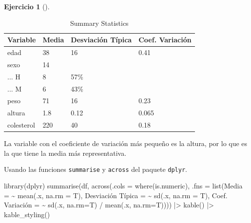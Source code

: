 \documentclass[
  a4paper,
]{scrreport}
\newenvironment{Shaded}{\begin{snugshade}}{\end{snugshade}}
\newcommand{\AttributeTok}[1]{\textcolor[rgb]{0.40,0.45,0.13}{#1}}
\newcommand{\ErrorTok}[1]{\textcolor[rgb]{0.68,0.00,0.00}{#1}}
\newcommand{\FunctionTok}[1]{\textcolor[rgb]{0.28,0.35,0.67}{#1}}
\newcommand{\NormalTok}[1]{\textcolor[rgb]{0.00,0.23,0.31}{#1}}
\newcommand{\OtherTok}[1]{\textcolor[rgb]{0.00,0.23,0.31}{#1}}
\newcommand{\SpecialCharTok}[1]{\textcolor[rgb]{0.37,0.37,0.37}{#1}}
\newcommand{\StringTok}[1]{\textcolor[rgb]{0.13,0.47,0.30}{#1}}
\theoremstyle{definition}
\newtheorem{exercise}{Ejercicio}[chapter]
\theoremstyle{remark}
\begin{document}
\begin{exercise}[]
\begin{enumerate}
\begin{tcolorbox}
\begin{table}
  \caption{\label{tab:unnamed-chunk-25}Summary Statistics}
  \centering
  \begin{tabular}[t]{llll}
  \toprule
  Variable & Media & Desviación Típica & Coef. Variación\\
  \midrule
  edad & 38 & 16 & 0.41\\
  sexo & 14 &  & \\
  ... H & 8 & 57\% & \\
  ... M & 6 & 43\% & \\
  peso & 71 & 16 & 0.23\\
  \addlinespace
  altura & 1.8 & 0.12 & 0.065\\
  colesterol & 220 & 40 & 0.18\\
  \bottomrule
  \end{tabular}
  \end{table}

  La variable con el coeficiente de variación más pequeño es la altura,
  por lo que es la que tiene la media más representativa.

  \end{tcolorbox}

  \begin{tcolorbox}[enhanced jigsaw, toprule=.15mm, rightrule=.15mm, arc=.35mm, colback=white, colbacktitle=quarto-callout-tip-color!10!white, toptitle=1mm, left=2mm, colframe=quarto-callout-tip-color-frame, opacityback=0, breakable, opacitybacktitle=0.6, bottomtitle=1mm, titlerule=0mm, title=\textcolor{quarto-callout-tip-color}{\faLightbulb}\hspace{0.5em}{Solución 2}, bottomrule=.15mm, coltitle=black, leftrule=.75mm]

  Usando las funciones \texttt{summarise} y \texttt{across} del paquete
  \texttt{dplyr}.

\begin{Shaded}
\begin{Highlighting}[]
\FunctionTok{library}\NormalTok{(dplyr)}
\FunctionTok{summarise}\NormalTok{(df, }\FunctionTok{across}\NormalTok{(}\AttributeTok{.cols =} \FunctionTok{where}\NormalTok{(is.numeric), }\AttributeTok{.fns =} \FunctionTok{list}\NormalTok{(}\AttributeTok{Media =} \SpecialCharTok{\textasciitilde{}} \FunctionTok{mean}\NormalTok{(.x, }\AttributeTok{na.rm =}\NormalTok{ T), }\StringTok{\textasciigrave{}}\AttributeTok{Desviación Típica}\StringTok{\textasciigrave{}} \OtherTok{=} \ErrorTok{\textasciitilde{}} \FunctionTok{sd}\NormalTok{(.x, }\AttributeTok{na.rm =}\NormalTok{ T), }\StringTok{\textasciigrave{}}\AttributeTok{Coef. Variación}\StringTok{\textasciigrave{}} \OtherTok{=} \ErrorTok{\textasciitilde{}} \FunctionTok{sd}\NormalTok{(.x, }\AttributeTok{na.rm=}\NormalTok{T) }\SpecialCharTok{/} \FunctionTok{mean}\NormalTok{(.x, }\AttributeTok{na.rm=}\NormalTok{T)))) }\SpecialCharTok{|\textgreater{}}
\FunctionTok{kable}\NormalTok{() }\SpecialCharTok{|\textgreater{}}
\FunctionTok{kable\_styling}\NormalTok{()}
\end{Highlighting}
\end{Shaded}


\end{tcolorbox}
\end{enumerate}
\end{exercise}
\end{document}
